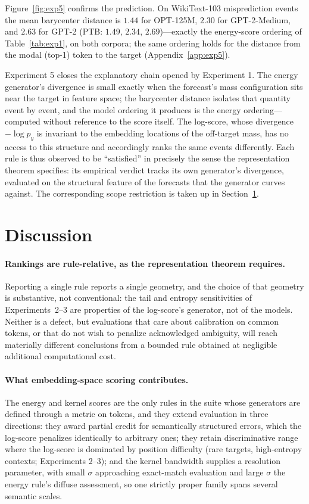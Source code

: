 \documentclass{article}
\begin{document}
Figure~\ref{fig:exp5} confirms the prediction. On WikiText-103 misprediction events the
mean barycenter distance is $1.44$ for OPT-125M, $2.30$ for GPT-2-Medium, and $2.63$ for
GPT-2 (PTB: $1.49$, $2.34$, $2.69$)---exactly the energy-score ordering of
Table~\ref{tab:exp1}, on both corpora; the same ordering holds for the distance from the
modal (top-1) token to the target (Appendix~\ref{app:exp5}).

Experiment 5 closes
the explanatory chain opened by Experiment 1. The energy generator's divergence is small
exactly when the forecast's mass configuration sits near the target in feature space;
the barycenter distance isolates that quantity event by event, and the model ordering it
produces is the energy ordering---computed without reference to the score itself. The
log-score, whose divergence $-\log p_y$ is invariant to the embedding locations of the
off-target mass, has no access to this structure and accordingly ranks the same events
differently. Each rule is thus observed to be ``satisfied'' in precisely the sense the
representation theorem specifies: its empirical verdict tracks its own generator's
divergence, evaluated on the structural feature of the forecasts that the generator
curves against. The corresponding scope restriction is taken up in
Section~\ref{sec:discussion}.

\section{Discussion}
\label{sec:discussion}

\paragraph{Rankings are rule-relative, as the representation theorem requires.}
Reporting a single rule reports a single geometry, and the choice of that geometry is
substantive, not conventional: the tail and entropy sensitivities of Experiments~2--3
are properties of the log-score's generator, not of the models. Neither is a defect, but
evaluations that care about calibration on common tokens, or that do not wish to
penalize acknowledged ambiguity, will reach materially different conclusions from a
bounded rule obtained at negligible additional computational cost.

\paragraph{What embedding-space scoring contributes.} The energy and kernel scores are
the only rules in the suite whose generators are defined through a metric on tokens, and
they extend evaluation in three directions: they award partial credit for semantically
structured errors, which the log-score penalizes identically to arbitrary ones; they
retain discriminative range where the log-score is dominated by position difficulty
(rare targets, high-entropy contexts; Experiments 2--3); and the kernel bandwidth
supplies a resolution parameter, with small $\sigma$ approaching exact-match evaluation
and large $\sigma$ the energy rule's diffuse assessment, so one strictly proper family
spans several semantic scales.
\end{document}
